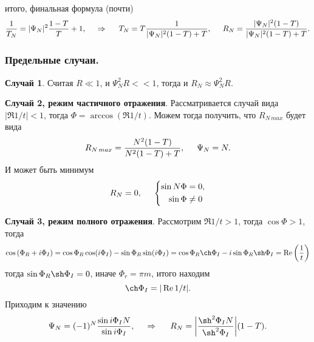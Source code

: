 итого, финальная формула (почти)
\begin{equation*}
    \frac{1}{T_N} = |\Psi_N|^2 \frac{1-T}{T} + 1,
    \hspace{0.5cm} \Rightarrow \hspace{0.5cm}
    T_N = T \frac{1}{|\Psi_N|^2 (1-T)+T},
    \hspace{5 mm} 
    R_N = \frac{|\Psi_N|^2 (1-T)}{|\Psi_N|^2 (1-T)+T}.
\end{equation*}





\subsubsection*{Предельные случаи.}


\textbf{ Случай 1}. Считая $R \ll 1$, и $\Psi_N^2 R << 1$, тогда и $R_N \approx \Psi_N^2 R$.


\textbf{ Случай 2, режим частичного отражения}. Рассматривается случай вида $|\Re 1/t| < 1$, тогда  $\Phi = \arccos\left(\Re 1/t\right)$. Можем тогда получить, что $R_{N\, max}$ будет вида
\begin{equation*}
    R_{N\, max} = \frac{N^2 (1-T)}{N^2 (1-T) + T}, \hspace{5 mm} \Psi_N = N.
\end{equation*}
И может быть минимум 
\begin{equation*}
    R_N = 0, \hspace{5 mm} \left\{\begin{aligned}
        \sin N \Phi &= 0, \\
        \sin \Phi &\neq 0
    \end{aligned}\right.
\end{equation*}



\textbf{ Случай 3, режим полного отражения}. Рассмотрим $\Re 1/t > 1$, тогда $\cos \Phi > 1$, тогда
\begin{equation*}
    \cos \left(\Phi_R + i \Phi_I\right) = \cos \Phi_R \cos (i \Phi_I) - \sin \Phi_R \sin (i \Phi_I) = 
    \cos \Phi_R \ch \Phi_I - i \sin \Phi_R \sh \Phi_I = \Re \left(\frac{1}{t}\right)
\end{equation*}
тогда $\sin \Phi_R \sh \Phi_I = 0$, иначе $\Phi_r = \pi m$, итого находим
\begin{equation*}
    \ch \Phi_I = |\Re 1/t|.
\end{equation*}
Приходим к значению
\begin{equation*}
    \Psi_N = (-1)^N \frac{\sin i \Phi_I N}{\sin i \Phi_I},
    \hspace{0.5cm} \Rightarrow \hspace{0.5cm}
    R_N = \bigg|
        \frac{\sh^2 \Phi_I N}{\sh^2 \Phi_I}
    \bigg| (1-T).
\end{equation*}
